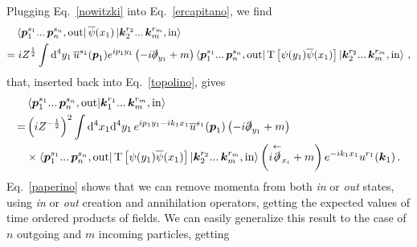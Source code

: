 \begin{sol}
\begin{equation}
    \end{equation}
    Plugging Eq.~\eqref{nowitzki} into Eq.~\eqref{ercapitano}, we find
    \begin{equation}
    \begin{split}
        &\bra{\boldsymbol{p}_1^{s_1} ...\, \boldsymbol{p}_n^{s_n}, {\rm out}}\overline{\psi}(x_1) \ket{\boldsymbol{k}_2^{r_2} ...\, \boldsymbol{k}_m^{r_m}, {\rm in}} \\
        = &\; iZ^{\frac{1}{2}} \int{\rm d}^4 y_1 \, \overline{u}^{s_1}(\boldsymbol{p}_1) e^{i p_1 y_1} \left( -i \slashed{\partial}_{y_1} + m\right) \bra{\boldsymbol{p}_1^{s_1} ...\, \boldsymbol{p}_n^{s_n}, {\rm out}} \mathbf{\rm T}\left[ \psi(y_1) \overline{\psi}(x_1)\right]\ket{\boldsymbol{k}_2^{r_2} ...\, \boldsymbol{k}_m^{r_m}, {\rm in}}\,,
        \end{split}
    \end{equation}
    that, inserted back into Eq.~\eqref{topolino}, gives
    \begin{equation}
    \label{paperino}
    \begin{split}
        &\bra{\boldsymbol{p}_1^{s_1} ...\, \boldsymbol{p}_n^{s_n}, {\rm out}} \ket{\boldsymbol{k}_1^{r_1} ...\, \boldsymbol{k}_m^{r_m}, {\rm in}} \\
        = & \left(i Z^{-\frac{1}{2}}\right)^{2} \int {\rm d}^4 x_1 {\rm d}^4 y_1 \, e^{ip_1 y_1 - ik_1 x_1} \overline{u}^{s_1}(\boldsymbol{p}_1) \left( -i \slashed{\partial}_{y_1} + m\right) \\
        & \times \bra{\boldsymbol{p}_1^{s_1} ...\, \boldsymbol{p}_n^{s_n}, {\rm out}}\mathbf{\rm T}\left[ \psi(y_1) \overline{\psi}(x_1)\right]\ket{\boldsymbol{k}_2^{r_2} ...\, \boldsymbol{k}_m^{r_m}, {\rm in}}
        \left( i \overset{\leftarrow}{\slashed{\partial}}_{x_i} + m\right) e^{-i k_1 x_1} u^{r_1}(\boldsymbol{k}_1)\,.
    \end{split}
    \end{equation}
    Eq.~\eqref{paperino} shows that we can remove momenta from both \emph{in} or \emph{out} states, using \emph{in} or \emph{out} creation and annihilation operators, getting the expected values of time ordered products of fields.
    We can easily generalize this result to the case of $n$ outgoing and $m$ incoming particles, getting

\end{sol}
